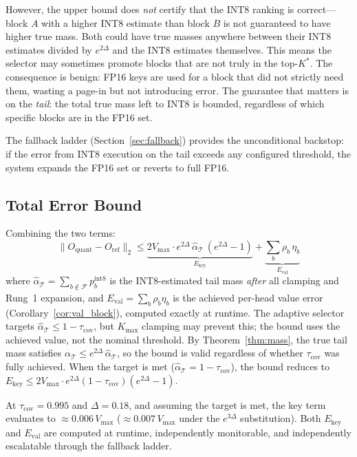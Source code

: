 \documentclass[11pt,a4paper]{article}
\theoremstyle{definition}
\theoremstyle{remark}
\newcommand{\norm}[1]{\lVert #1 \rVert}
\begin{document}
However, the upper bound does \emph{not} certify that the INT8 ranking is correct---block $A$ with a higher INT8 estimate than block $B$ is not guaranteed to have higher true mass.  Both could have true masses anywhere between their INT8 estimates divided by $e^{2\Delta}$ and the INT8 estimates themselves.  This means the selector may sometimes promote blocks that are not truly in the top-$K^*$.  The consequence is benign: FP16 keys are used for a block that did not strictly need them, wasting a page-in but not introducing error.  The guarantee that matters is on the \emph{tail}: the total true mass left to INT8 is bounded, regardless of which specific blocks are in the FP16 set.

The fallback ladder (Section~\ref{sec:fallback}) provides the unconditional backstop: if the error from INT8 execution on the tail exceeds any configured threshold, the system expands the FP16 set or reverts to full FP16.

\subsection{Total Error Bound}

Combining the two terms:
\begin{equation}
\label{eq:total}
  \norm{O_{\mathrm{quant}} - O_{\mathrm{ref}}}_2 \leq \underbrace{2 V_{\max} \cdot e^{2\Delta}\,\hat{\alpha}_{\mathcal{T}}\,(e^{2\Delta} - 1)}_{E_{\mathrm{key}}} + \underbrace{\textstyle\sum_b \rho_b\,\eta_b}_{E_{\mathrm{val}}}
\end{equation}
where $\hat{\alpha}_{\mathcal{T}} = \sum_{b \notin \mathcal{F}} p_b^{\mathrm{int8}}$ is the INT8-estimated tail mass \emph{after} all clamping and Rung~1 expansion, and $E_{\mathrm{val}} = \sum_b \rho_b \eta_b$ is the achieved per-head value error (Corollary~\ref{cor:val_block}), computed exactly at runtime.  The adaptive selector targets $\hat{\alpha}_{\mathcal{T}} \leq 1 - \tau_{\mathrm{cov}}$, but $K_{\max}$ clamping may prevent this; the bound uses the achieved value, not the nominal threshold.  By Theorem~\ref{thm:mass}, the true tail mass satisfies $\alpha_{\mathcal{T}} \leq e^{2\Delta}\,\hat{\alpha}_{\mathcal{T}}$, so the bound is valid regardless of whether $\tau_{\mathrm{cov}}$ was fully achieved.  When the target is met ($\hat{\alpha}_{\mathcal{T}} = 1 - \tau_{\mathrm{cov}}$), the bound reduces to $E_{\mathrm{key}} \leq 2V_{\max} \cdot e^{2\Delta}(1 - \tau_{\mathrm{cov}})(e^{2\Delta} - 1)$.

At $\tau_{\mathrm{cov}} = 0.995$ and $\Delta = 0.18$, and assuming the target is met, the key term evaluates to $\approx 0.006\,V_{\max}$ ($\approx 0.007\,V_{\max}$ under the $e^{3\Delta}$ substitution).  Both $E_{\mathrm{key}}$ and $E_{\mathrm{val}}$ are computed at runtime, independently monitorable, and independently escalatable through the fallback ladder.
\end{document}
